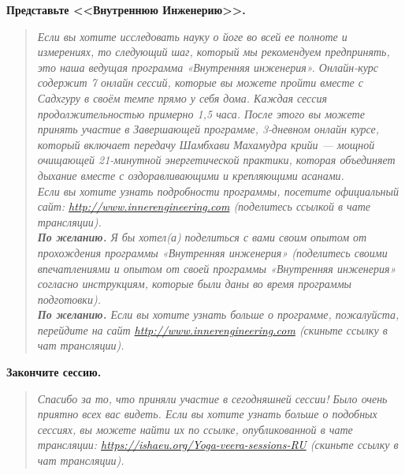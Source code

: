 \textbf{Представьте <<Внутреннюю Инженерию>>.}
\begin{quote}\emph{%
\noindent%
Если вы хотите исследовать науку о йоге во всей ее полноте и измерениях,
то следующий шаг, который мы рекомендуем предпринять, это наша
ведущая программа «Внутренняя инженерия». Онлайн-курс содержит 7
онлайн сессий, которые вы можете пройти вместе с Садхгуру в своём
темпе прямо у себя дома. Каждая сессия продолжительностью примерно
1,5 часа. После этого вы можете принять участие в Завершающей
программе, 3-дневном онлайн курсе, который включает передачу
Шамбхави Махамудра крийи — мощной очищающей 21-минутной
энергетической практики, которая объединяет дыхание вместе с
оздоравливающими и крепляющими асанами.
\\[3pt]
Если вы хотите узнать подробности программы, посетите официальный
сайт: \href{http://www.innerengineering.com}{\small http://www.innerengineering.com} {\color{CadetBlue}(поделитесь ссылкой в чате трансляции)}.
\\[3pt]
\textbf{По желанию.} Я бы хотел(а) поделиться с вами своим опытом от прохождения программы «Внутренняя инженерия» {\color{CadetBlue}(поделитесь своими впечатлениями и опытом от своей программы «Внутренняя инженерия» согласно инструкциям, которые были даны во время программы подготовки)}.
\\[3pt]
 \textbf{По желанию.} Если вы хотите узнать больше о программе, пожалуйста, перейдите на сайт \href{http://www.innerengineering.com}{\small http://www.innerengineering.com} {\color{CadetBlue}(скиньте ссылку в чат трансляции)}. 
}\end{quote}
\textbf{Закончите сессию.}
\begin{quote}\emph{%
\noindent%
Спасибо за то, что приняли участие в сегодняшней сессии! Было очень приятно всех вас видеть. Если вы хотите узнать больше о подобных сессиях, вы можете найти их по ссылке, опубликованной в чате трансляции: \href{https://ishaeu.org/Yoga-veera-sessions-RU}{\small https://ishaeu.org/Yoga-veera-sessions-RU} {\color{CadetBlue}(скиньте ссылку в чат трансляции)}. 
}\end{quote}

